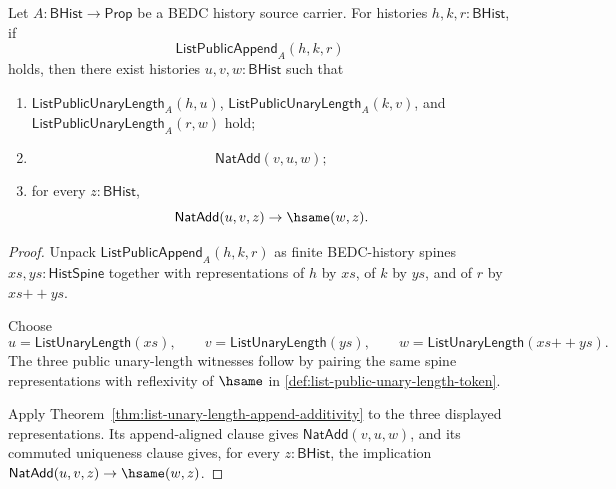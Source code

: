 \begin{theorem}
\label{thm:list-public-append-unary-length-additivity}
Let $A:\mathsf{BHist}\to\mathsf{Prop}$ be a BEDC history source carrier. For
histories $h,k,r:\mathsf{BHist}$, if
$$
\mathsf{ListPublicAppend}_A(h,k,r)
$$
holds, then there exist histories $u,v,w:\mathsf{BHist}$ such that
\begin{enumerate}
  \item $\mathsf{ListPublicUnaryLength}_A(h,u)$,
  $\mathsf{ListPublicUnaryLength}_A(k,v)$, and
  $\mathsf{ListPublicUnaryLength}_A(r,w)$ hold;
  \item
  $$
  \mathsf{NatAdd}(v,u,w);
  $$
  \item for every $z:\mathsf{BHist}$,
  $$
  \mathsf{NatAdd}(u,v,z)\to \hsame(w,z).
  $$
\end{enumerate}
\end{theorem}
\begin{proof}
Unpack $\mathsf{ListPublicAppend}_A(h,k,r)$ as finite BEDC-history spines
$xs,ys:\mathsf{HistSpine}$ together with representations of $h$ by $xs$, of $k$
by $ys$, and of $r$ by $xs{++}ys$.

Choose
$$
u=\mathsf{ListUnaryLength}(xs),\qquad
v=\mathsf{ListUnaryLength}(ys),\qquad
w=\mathsf{ListUnaryLength}(xs{++}ys).
$$
The three public unary-length witnesses follow by pairing the same spine
representations with reflexivity of $\hsame$ in
\autoref{def:list-public-unary-length-token}.

Apply Theorem~\ref{thm:list-unary-length-append-additivity} to the three
displayed representations. Its append-aligned clause gives
$\mathsf{NatAdd}(v,u,w)$, and its commuted uniqueness clause gives, for every
$z:\mathsf{BHist}$, the implication
$\mathsf{NatAdd}(u,v,z)\to\hsame(w,z)$.
\end{proof}

